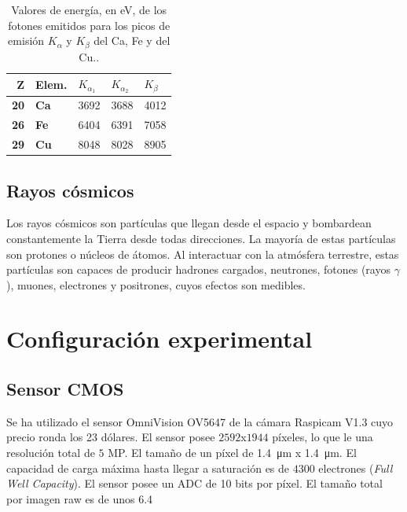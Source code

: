 \documentclass[twoside,twocolumn]{article}
\begin{document}
      \begin{table}[h]
        \centering
        \begin{tabular}{|rl|ll|l|} \hline
        \textbf{Z}  & \textbf{\small{Elem.}} & $K_{\alpha_1}$ & $K_{\alpha_2}$ & $K_\beta$ \\ \hline
        \textbf{20} & \textbf{Ca}       & 3692         & 3688         & 4012        \\
        \textbf{26} & \textbf{Fe}       & 6404         & 6391         & 7058        \\
        \textbf{29} & \textbf{Cu}       & 8048         & 8028         & 8905       \\ \hline
        \end{tabular}
        \caption{Valores de energía, en eV, de los fotones emitidos para los picos de emisión 
          $K_{\alpha}$ y $K_{\beta}$ del Ca, Fe y del Cu.\cite{xraybooklet}.}
        \label{tab:xraypeaks}
        \end{table}

    \subsection{Rayos cósmicos}\label{sec:intro:cosmic_ray}
      Los rayos cósmicos son partículas que llegan desde el espacio y bombardean constantemente la Tierra desde todas direcciones.
      La mayoría de estas partículas son protones o núcleos de átomos.
      Al interactuar con la atmósfera terrestre, estas partículas son capaces de producir hadrones cargados, neutrones,
      fotones (rayos $\gamma$), muones, electrones y positrones, \cite{GriederCRAE}
      cuyos efectos son medibles.

  \section{Configuración experimental}\label{sec:conf_exp}

    \subsection{Sensor CMOS}\label{sec:conf_exp:CMOS}
      Se ha utilizado el sensor OmniVision OV5647 de la cámara Raspicam V1.3 cuyo precio ronda los 23 dólares.
      El sensor posee	$2592$x$1944$ píxeles, lo que le una resolución total de $5$ MP.
      El tamaño de un píxel de \SI{1.4}{\micro\meter} x \SI{1.4}{\micro\meter}.
      El capacidad de carga máxima hasta llegar a saturación es de $4300$ electrones (\emph{Full Well Capacity}).
      El sensor posee un ADC de 10 bits por píxel.
      El tamaño total por imagen raw es de unos \SI{6.4}{\mega\byte}
\end{document}
